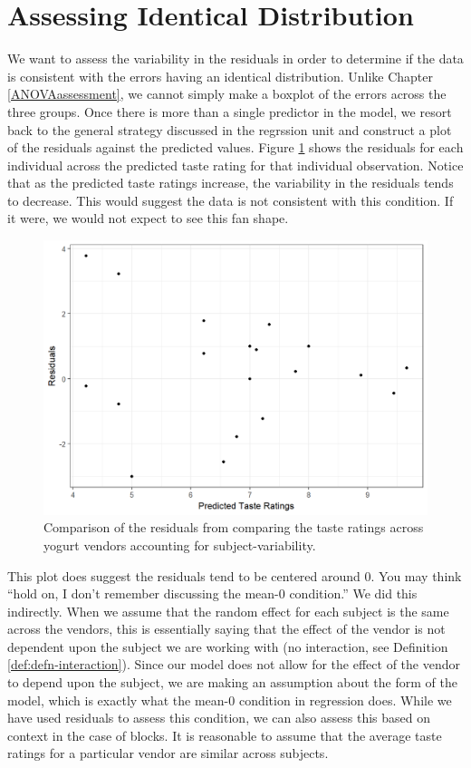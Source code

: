 \documentclass[]{book}
\theoremstyle{plain}
\theoremstyle{mydefn}
\theoremstyle{myexmpl}
\theoremstyle{remark}
\begin{document}
\section{Assessing Identical
Distribution}\label{assessing-identical-distribution}

We want to assess the variability in the residuals in order to determine
if the data is consistent with the errors having an identical
distribution. Unlike Chapter \ref{ANOVAassessment}, we cannot simply
make a boxplot of the errors across the three groups. Once there is more
than a single predictor in the model, we resort back to the general
strategy discussed in the regrssion unit and construct a plot of the
residuals against the predicted values. Figure
\ref{fig:blockassessment-variance-yogurt} shows the residuals for each
individual across the predicted taste rating for that individual
observation. Notice that as the predicted taste ratings increase, the
variability in the residuals tends to decrease. This would suggest the
data is not consistent with this condition. If it were, we would not
expect to see this fan shape.

\begin{figure}

{\centering \includegraphics[width=0.8\linewidth]{./Images/blockassessment-variance-yogurt-1} 

}

\caption{Comparison of the residuals from comparing the taste ratings across yogurt vendors accounting for subject-variability.}\label{fig:blockassessment-variance-yogurt}
\end{figure}

This plot does suggest the residuals tend to be centered around 0. You
may think ``hold on, I don't remember discussing the mean-0 condition.''
We did this indirectly. When we assume that the random effect for each
subject is the same across the vendors, this is essentially saying that
the effect of the vendor is not dependent upon the subject we are
working with (no interaction, see Definition
\ref{def:defn-interaction}). Since our model does not allow for the
effect of the vendor to depend upon the subject, we are making an
assumption about the form of the model, which is exactly what the mean-0
condition in regression does. While we have used residuals to assess
this condition, we can also assess this based on context in the case of
blocks. It is reasonable to assume that the average taste ratings for a
particular vendor are similar across subjects.
\end{document}

